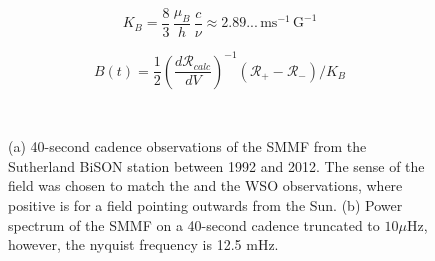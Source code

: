 \begin{equation}
K_B = \frac{8}{3} \, \frac{\mu_B}{h} \, \frac{c}{\nu} \approx 2.89... \, \mathrm{ms}^{-1} \, \mathrm{G}^{-1}
\label{eq:K_B}
\end{equation}

\begin{equation}
B(t) = \frac{1}{2} \left( \frac{d\mathcal{R}_{calc}}{dV} \right)^{-1} (\mathcal{R}_{+} - \mathcal{R}_{-}) / K_B
\label{eq:simplified_SMMF_cal}
\end{equation}

\begin{figure}[ht!]
	\centering
	 \\ 
	\centering
	\caption{(a) 40-second cadence observations of the SMMF from the Sutherland BiSON station between 1992 and 2012. The sense of the field was chosen to match the \citet{chaplin_studies_2003} and the WSO observations, where positive is for a field pointing outwards from the Sun. (b) Power spectrum of the SMMF on a 40-second cadence truncated to $10 \mu\mathrm{Hz}$, however, the nyquist frequency is 12.5 mHz.}  
	\label{fig:BiSON_SMMF}
\end{figure}

